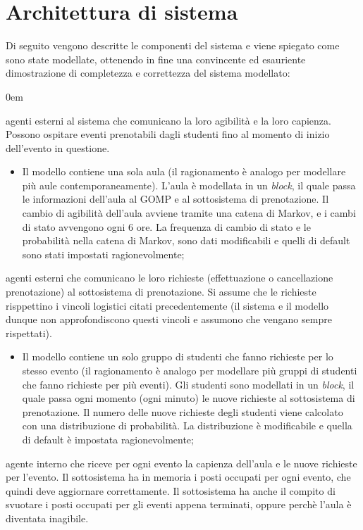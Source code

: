 \documentclass[11pt]{article}
\begin{document}
	\newpage
	\section{Architettura di sistema}
	Di seguito vengono descritte le componenti del sistema e viene spiegato come sono state modellate, ottenendo in fine una convincente ed esauriente dimostrazione di completezza e correttezza del sistema modellato:
	\begin{description}
		\addtolength{\itemindent}{0.5cm}
		\itemsep0em
		\item [Aule] agenti esterni al sistema che comunicano la loro agibilità e la loro capienza. Possono ospitare eventi prenotabili dagli studenti fino al momento di inizio dell'evento in questione.
		\begin{itemize}
			\itemsep0em
			\item Il modello contiene una sola aula (il ragionamento è analogo per modellare più aule contemporaneamente). L'aula è modellata in un \textit{block}, il quale passa le informazioni dell'aula al GOMP e al sottosistema di prenotazione. Il cambio di agibilità dell'aula avviene tramite una catena di Markov, e i cambi di stato avvengono ogni 6 ore. La frequenza di cambio di stato e le probabilità nella catena di Markov, sono dati modificabili e quelli di default sono stati impostati ragionevolmente;
		\end{itemize}
		\item [Studenti] agenti esterni che comunicano le loro richieste (effettuazione o cancellazione prenotazione) al sottosistema di prenotazione. Si assume che le richieste risppettino i vincoli logistici citati precedentemente (il sistema e il modello dunque non approfondiscono questi vincoli e assumono che vengano sempre rispettati).
		\begin{itemize}
			\itemsep0em
			\item Il modello contiene un solo gruppo di studenti che fanno richieste per lo stesso evento (il ragionamento è analogo per modellare più gruppi di studenti che fanno richieste per più eventi). Gli studenti sono modellati in un \textit{block}, il quale passa ogni momento (ogni minuto) le nuove richieste al sottosistema di prenotazione. Il numero delle nuove richieste degli studenti viene calcolato con una distribuzione di probabilità. La distribuzione è modificabile e quella di default è impostata ragionevolmente;
		\end{itemize}
		\item [Sottosistema di prenotazione] agente interno che riceve per ogni evento la capienza dell'aula e le nuove richieste per l'evento. Il sottosistema ha in memoria i posti occupati per ogni evento, che quindi deve aggiornare correttamente. Il sottosistema ha anche il compito di svuotare i posti occupati per gli eventi appena terminati, oppure perchè l'aula è diventata inagibile.

\end{description}
\end{document}
